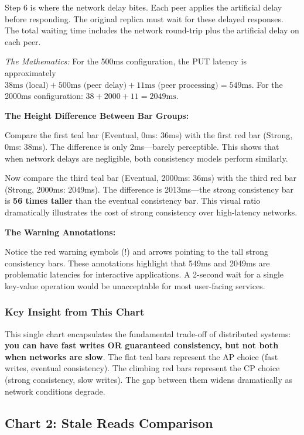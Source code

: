 \documentclass[10pt,a4paper]{article}
\begin{document}
Step 6 is where the network delay bites. Each peer applies the artificial delay before responding. The original replica must wait for these delayed responses. The total waiting time includes the network round-trip plus the artificial delay on each peer.

\textit{The Mathematics:} For the 500ms configuration, the PUT latency is approximately $38\text{ms (local)} + 500\text{ms (peer delay)} + 11\text{ms (peer processing)} = 549\text{ms}$. For the 2000ms configuration: $38 + 2000 + 11 = 2049\text{ms}$.

\textbf{The Height Difference Between Bar Groups:}

Compare the first teal bar (Eventual, 0ms: 36ms) with the first red bar (Strong, 0ms: 38ms). The difference is only 2ms---barely perceptible. This shows that when network delays are negligible, both consistency models perform similarly.

Now compare the third teal bar (Eventual, 2000ms: 36ms) with the third red bar (Strong, 2000ms: 2049ms). The difference is 2013ms---the strong consistency bar is \textbf{56 times taller} than the eventual consistency bar. This visual ratio dramatically illustrates the cost of strong consistency over high-latency networks.

\textbf{The Warning Annotations:}

Notice the red warning symbols (!) and arrows pointing to the tall strong consistency bars. These annotations highlight that 549ms and 2049ms are problematic latencies for interactive applications. A 2-second wait for a single key-value operation would be unacceptable for most user-facing services.

\subsubsection{Key Insight from This Chart}

This single chart encapsulates the fundamental trade-off of distributed systems: \textbf{you can have fast writes OR guaranteed consistency, but not both when networks are slow}. The flat teal bars represent the AP choice (fast writes, eventual consistency). The climbing red bars represent the CP choice (strong consistency, slow writes). The gap between them widens dramatically as network conditions degrade.

\newpage

\subsection{Chart 2: Stale Reads Comparison}
\end{document}
